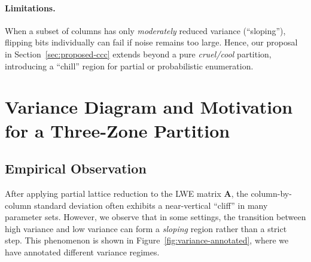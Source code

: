 \documentclass[11pt]{article}
\begin{document}
\paragraph{Limitations.}
When a subset of columns has only \emph{moderately} reduced variance (``sloping''), flipping bits individually can fail if noise remains too large. 
Hence, our proposal in Section~\ref{sec:proposed-ccc} extends beyond a pure \emph{cruel/cool} partition, introducing a ``chill'' region for partial or probabilistic enumeration.

\section{Variance Diagram and Motivation for a Three-Zone Partition}
\label{sec:3zone-motivation}

\subsection{Empirical Observation}
After applying partial lattice reduction to the LWE matrix $\mathbf{A}$, the column-by-column standard deviation often exhibits a near-vertical ``cliff'' in many parameter sets. However, we observe that in some settings, the transition between high variance and low variance can form a \emph{sloping} region rather than a strict step. This phenomenon is shown in Figure~\ref{fig:variance-annotated}, where we have annotated different variance regimes.
\end{document}
